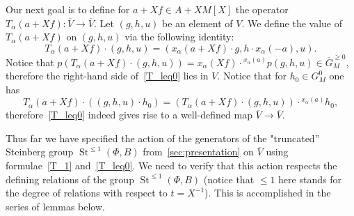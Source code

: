 \documentclass[10pt,a4paper,twoside]{article}
\theoremstyle{remark}
\theoremstyle{definition}
\numberwithin{lemma}{section}
\numberwithin{prop}{section}
\numberwithin{corollary}{section}
\numberwithin{externaltheorem}{section}
\DeclareMathOperator{\St}{St}
\numberwithin{equation}{section}
\begin{document}
Our next goal is to define for $a + Xf \in A + XM[X]$ the operator $T_\alpha(a + Xf) \colon \overline{V} \to \overline{V}$.
Let $(g, h, u)$ be an element of $V$. We define the value of $T_\alpha(a + Xf)$ on $(g, h, u)$ via the following identity:
\begin{equation} \label{T_leq0} T_\alpha(a + Xf) \cdot (g, h, u) = (x_\alpha(a + Xf) \cdot g, h \cdot x_{\alpha}(-a), u).  \end{equation}
Notice that $p(T_\alpha(a + Xf) \cdot (g, h, u)) = x_\alpha(Xf) \cdot {}^{x_\alpha(a)}p(g, h, u) \in \overline{G}_M^{\geq 0},$ therefore
 the right-hand side of~\eqref{T_leq0} lies in $V$. Notice that for $h_0 \in G^0_M$ one has
\[T_\alpha(a + Xf) \cdot ((g, h, u) \cdot h_0) = (T_\alpha(a + Xf) \cdot (g, h, u)) \cdot {}^{x_{\alpha}(a)}\!h_0,\]  
therefore~\eqref{T_leq0} indeed gives rise to a well-defined map $\overline{V} \to \overline{V}$.

Thus far we have specified the action of the generators of the "truncated'' Steinberg group $\St^{\leq 1}(\Phi, B)$ from~\cref{sec:presentation} on $\overline{V}$ using formulae~\eqref{T_1} and~\eqref{T_leq0}. We need to verify that this action respects the defining relations of the group $\St^{\leq 1}(\Phi, B)$ (notice that $\leq 1$ here stands for the degree of relations with respect to $t = X^{-1}$). This is accomplished in the series of lemmas below.
\end{document}
